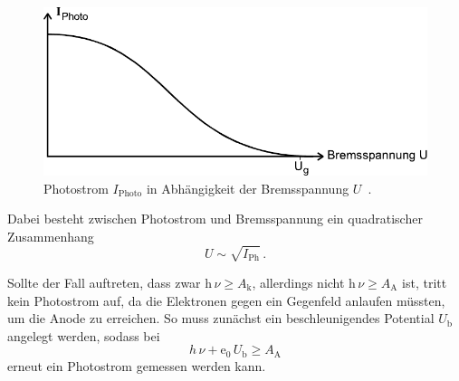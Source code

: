 \begin{figure}[H]
    \centering
    \includegraphics{figures/Abb4.pdf}
    \caption{Photostrom $I_\text{Photo}$ in Abhängigkeit der Bremsspannung $U$ \,\cite{ap10}.}
    \label{fig:abb4}
\end{figure}

Dabei besteht zwischen Photostrom und Bremsspannung ein quadratischer Zusammenhang
\begin{equation*}
    U \sim \sqrt{I_\text{Ph}} \,.
\end{equation*}

Sollte der Fall auftreten, dass zwar $\text{h} \, \nu \geq A_\text{k}$, allerdings nicht $\text{h} \, \nu \geq A_\text{A}$ ist, tritt kein Photostrom auf, da die Elektronen gegen ein Gegenfeld anlaufen müssten,
um die Anode zu erreichen.
So muss zunächst ein beschleunigendes Potential $U_\text{b}$ angelegt werden, sodass bei
\begin{equation*}
    h \, \nu + \text{e}_0 \, U_\text{b} \geq A_\text{A}
\end{equation*}
erneut ein Photostrom gemessen werden kann.

